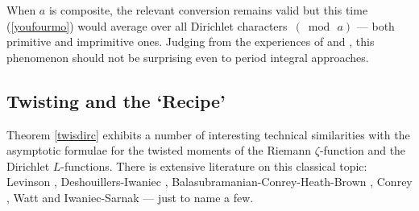 \documentclass[11pt,reqno]{amsart}
\theoremstyle{definition}
\theoremstyle{definition}
\theoremstyle{remark}
\numberwithin{equation}{section}
\begin{document}
 
 
 When $a$ is composite, the relevant conversion remains valid but this time (\ref{youfourmo}) would average over all Dirichlet characters\,  $(\bmod\, a)$ --- both  primitive and imprimitive ones. Judging from the experiences of \cite{BHKM20} and \cite{Wu22}, this phenomenon should not be surprising even to  period integral approaches.  
 
 











\subsection{Twisting and the `Recipe'}\label{twisintro}

Theorem \ref{twisdirc} exhibits a number of interesting  technical similarities with the asymptotic formulae for the  twisted moments of the Riemann  $\zeta$-function and  the Dirichlet $L$-functions.    There is extensive literature on this classical   topic:  Levinson  \cite{Le74}, Deshouillers-Iwaniec \cite{DI84}, Balasubramanian-Conrey-Heath-Brown \cite{BCHB85}, Conrey \cite{C89}, Watt \cite{W95} and Iwaniec-Sarnak \cite{IS99} --- just to name a few. 
\end{document}
